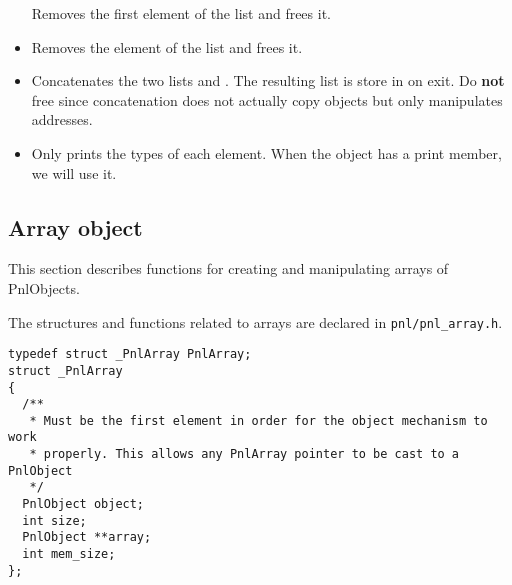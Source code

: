 \begin{itemize}
  \sshortdescribe Removes the first element of the list  and frees it.
\item {}
  \sshortdescribe Removes the  element of the list  and frees it.
\item {}
  \sshortdescribe Concatenates the two lists  and . The
  resulting list is store in  on exit. Do {\bf not} free 
  since concatenation does not actually copy objects but only manipulates
  addresses.
\item {}
  \sshortdescribe Only prints the types of each element. When  the
   object has a print member, we will use it.
\end{itemize}

\subsection{Array object}

This section describes functions for creating and manipulating arrays of
PnlObjects.

The structures and functions related to arrays are declared in
\verb!pnl/pnl_array.h!.

\begin{verbatim}
typedef struct _PnlArray PnlArray;
struct _PnlArray
{
  /**
   * Must be the first element in order for the object mechanism to work
   * properly. This allows any PnlArray pointer to be cast to a PnlObject
   */
  PnlObject object; 
  int size;
  PnlObject **array;
  int mem_size;
};
\end{verbatim}

